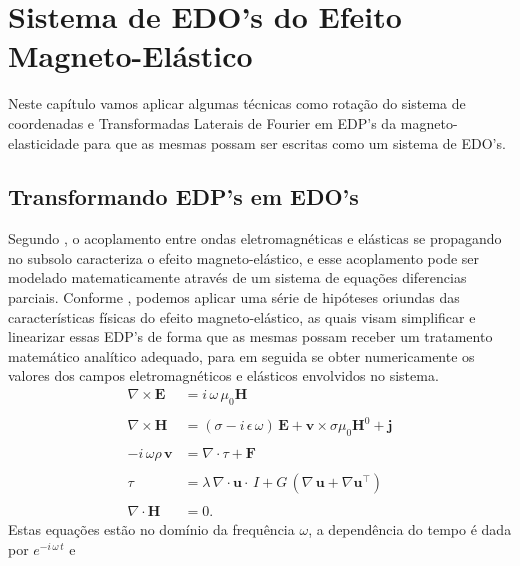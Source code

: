 \chapter{Sistema de EDO's do Efeito Magneto-El\'astico}\label{sec.trans_edp_2_edo}
Neste cap\'itulo vamos aplicar algumas t\'ecnicas como rota\c{c}\~ao do sistema de coordenadas e Transformadas Laterais de Fourier em EDP's da magneto-elasticidade para que as mesmas possam ser escritas como um sistema de EDO's.

\section{Transformando EDP's em EDO's}

Segundo \cite{eringen_1963}, o acoplamento entre ondas eletromagn\'eticas e el\'asticas se propagando no subsolo caracteriza o efeito magneto-el\'astico, e esse acoplamento pode ser modelado matematicamente atrav\'es de um sistema de equa\c{c}\~oes diferencias parciais. Conforme \cite{pinho_2018}, podemos aplicar uma s\'erie de hip\'oteses oriundas das caracter\'isticas f\'isicas do efeito magneto-el\'astico, as quais visam simplificar e linearizar essas EDP's de forma que as mesmas possam receber um tratamento matem\'atico anal\'itico adequado, para em seguida se obter numericamente os valores dos campos eletromagn\'eticos e el\'asticos envolvidos no sistema. 
\begin{align}\label{eq.mag_ela_1}
\nabla\times\mathbf{{E}}&=i\,\omega\,\mu_0\mathbf{{H}}\\\nonumber\\\label{eq.mag_ela_2}
\nabla\times\mathbf{{H}}&=(\sigma-i\,\epsilon\,\omega)\,\mathbf{{E}}+\mathbf{{v}}\times\sigma\mu_0\mathbf{H}^0+\mathbf{j}\\\nonumber\\\label{eq.mag_ela_3}
-i\,\omega\rho\,\mathbf{{v}}&=\nabla\cdot{\tau} + \mathbf{{F}}\\\nonumber\\\label{eq.mag_ela_4}
{\tau}&=\lambda\,\nabla\cdot\mathbf{{u}}\cdot\,I + G\,(\nabla\,\mathbf{{u}}+\nabla\mathbf{{u}}^\top)\\\nonumber\\\label{eq.mag_ela_5}
\nabla\cdot\mathbf{{H}}&=0.
\end{align}
Estas equa\c{c}\~oes est\~ao no dom\'inio da frequ\^encia $\omega$, a depend\^encia do tempo \'e dada por $e^{-i\,\omega\,t}$ e 
